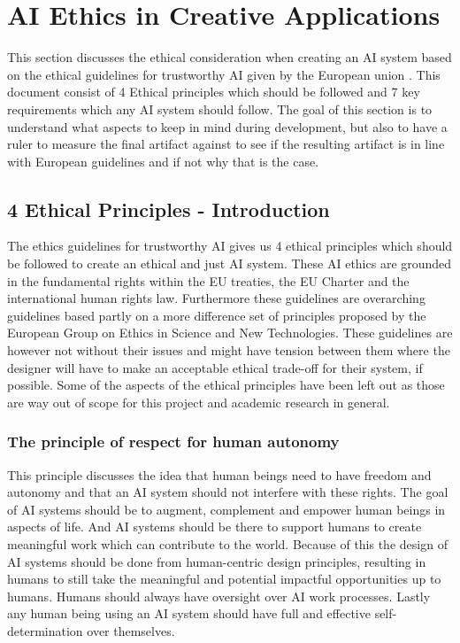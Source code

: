 \section{AI Ethics in Creative Applications} \label{AIethics}
This section discusses the ethical consideration when creating an AI system based on the ethical guidelines for trustworthy AI given by the European union \cite{europeancommission2019ethics}. This document consist of 4 Ethical principles which should be followed and 7 key requirements which any AI system should follow. The goal of this section is to understand what aspects to keep in mind during development, but also to have a ruler to measure the final artifact against to see if the resulting artifact is in line with European guidelines and if not why that is the case.

\subsection{4 Ethical Principles  - Introduction}
The ethics guidelines for trustworthy AI gives us 4 ethical principles which should be followed to create an ethical and just AI system. These AI ethics are grounded in the fundamental rights within the EU treaties, the EU Charter and the international human rights law.  Furthermore these guidelines are overarching guidelines based partly on a more difference set of principles proposed by the European Group on Ethics in Science and New Technologies\cite{floridi2018ai4people}. These guidelines are however not without their issues and might have tension between them where the designer will have to make an acceptable ethical trade-off for their system, if possible. Some of the aspects of the ethical principles have been left out as those are way out of scope for this project and academic research in general.

\subsubsection*{The principle of respect for human autonomy}
This principle discusses the idea that human beings need to have freedom and autonomy and that an AI system should not interfere with these rights. The goal of AI systems should be to augment, complement and empower human beings in aspects of life. And AI systems should be there to support humans to create meaningful work which can contribute to the world. Because of this the design of AI systems should be done from human-centric design principles, resulting in humans to still take the meaningful and potential impactful opportunities up to humans. Humans should always have oversight over AI work processes. Lastly any human being using an AI system should have full and effective self-determination over themselves.


